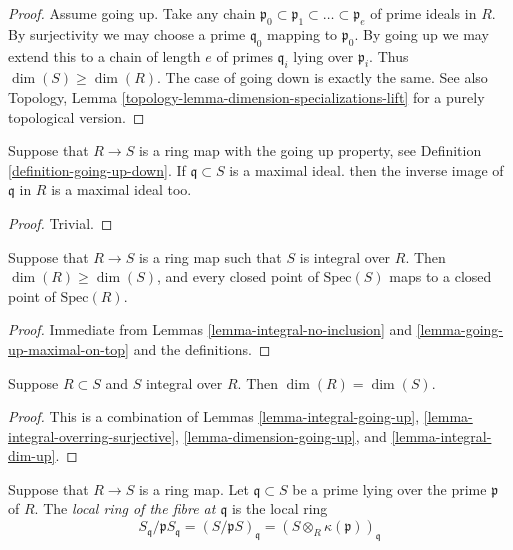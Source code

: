 \begin{proof}
Assume going up.
Take any chain $\mathfrak p_0 \subset \mathfrak p_1 \subset \ldots
\subset \mathfrak p_e$ of prime ideals in $R$.
By surjectivity we may choose a prime $\mathfrak q_0$ mapping
to $\mathfrak p_0$. By going up we may extend this to a chain
of length $e$ of primes $\mathfrak q_i$ lying over
$\mathfrak p_i$. Thus $\dim(S) \geq \dim(R)$.
The case of going down is exactly the same.
See also Topology, Lemma \ref{topology-lemma-dimension-specializations-lift}
for a purely topological version.
\end{proof}

\begin{lemma}
\label{lemma-going-up-maximal-on-top}
Suppose that $R \to S$ is a ring map with the going up property,
see Definition \ref{definition-going-up-down}. If
$\mathfrak q \subset S$ is a maximal ideal.
then the inverse image of $\mathfrak q$ in $R$
is a maximal ideal too.
\end{lemma}

\begin{proof}
Trivial.
\end{proof}

\begin{lemma}
\label{lemma-integral-dim-up}
Suppose that $R \to S$ is a ring map such that $S$ is integral over $R$.
Then $\dim (R) \geq \dim(S)$, and every closed point of $\text{Spec}(S)$
maps to a closed point of $\text{Spec}(R)$.
\end{lemma}

\begin{proof}
Immediate from Lemmas \ref{lemma-integral-no-inclusion} and
\ref{lemma-going-up-maximal-on-top}
and the definitions.
\end{proof}

\begin{lemma}
\label{lemma-integral-sub-dim-equal}
Suppose $R \subset S$ and $S$ integral over $R$.
Then $\dim(R) = \dim(S)$.
\end{lemma}

\begin{proof}
This is a combination of Lemmas
\ref{lemma-integral-going-up},
\ref{lemma-integral-overring-surjective},
\ref{lemma-dimension-going-up}, and
\ref{lemma-integral-dim-up}.
\end{proof}

\begin{definition}
\label{definition-fibre}
Suppose that $R \to S$ is a ring map.
Let $\mathfrak q \subset S$ be a prime lying
over the prime $\mathfrak p$ of $R$.
The {\it local ring of the fibre at $\mathfrak q$}
is the local ring
$$
S_{\mathfrak q}/\mathfrak pS_{\mathfrak q}
=
(S/\mathfrak pS)_{\mathfrak q}
=
(S\otimes_R \kappa(\mathfrak p))_{\mathfrak q}
$$
\end{definition}

